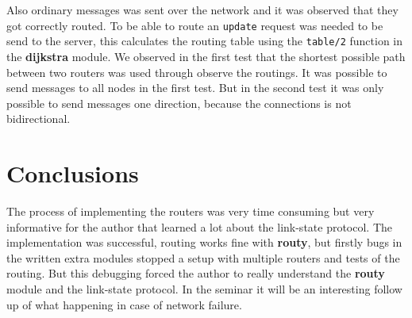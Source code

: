 \documentclass[a4paper, 11pt]{article}
\begin{document}
Also ordinary messages was sent over the network and it was observed that they got correctly routed. To be able to route an \verb!update! request was needed to be send to the server, this calculates the routing table using the \verb!table/2! function in the \textbf{dijkstra} module.
We observed in the first test that the shortest possible path between two routers was used through observe the routings. It was possible to send messages to all nodes in the first test. But in the second test it was only possible to send messages one direction, because the connections is not bidirectional.

\section{Conclusions}

The process of implementing the routers was very time consuming but very informative for the author that learned a lot about the link-state protocol. The implementation was successful, routing works fine with \textbf{routy}, but firstly bugs in the written extra modules stopped a setup with multiple routers and tests of the routing. But this debugging forced the author to really understand the \textbf{routy} module and the link-state protocol. In the seminar it will be an interesting follow up of what happening in case of network failure.
\end{document}
